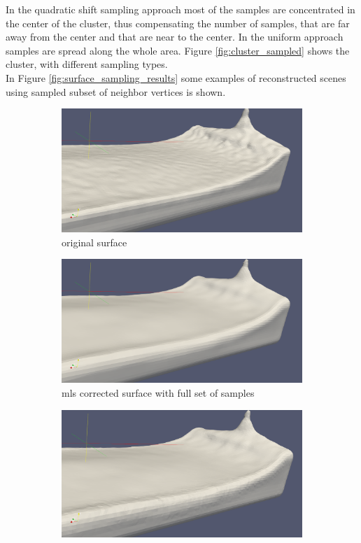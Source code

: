 In the quadratic shift sampling approach most of the samples are concentrated in the center of the cluster, thus compensating the number of samples, that are far away from the center and that are near to the center. In the uniform approach samples are spread along the whole area. Figure \ref{fig:cluster_sampled} shows the cluster, with different sampling types.\\
In Figure \ref{fig:surface_sampling_results} some examples of reconstructed scenes using sampled subset of neighbor vertices is shown.
\begin{figure}
	\begin{center}
		\begin{subfigure}[b]{\textwidth}
			\includegraphics[width=\textwidth]{figures/MLSSurfaceOriginal.png}
			\caption{original surface}
		\end{subfigure}
		\begin{subfigure}[b]{\textwidth}
			\includegraphics[width=\textwidth]{figures/MLSSurfaceSamplingFullSet.png}
			\caption{mls corrected surface with full set of samples}
		\end{subfigure}
		\begin{subfigure}[b]{\textwidth}
			\includegraphics[width=\textwidth]{figures/MLSSurfaceSamplingQuarterSet.png}

\end{subfigure}
\end{center}
\end{figure}
